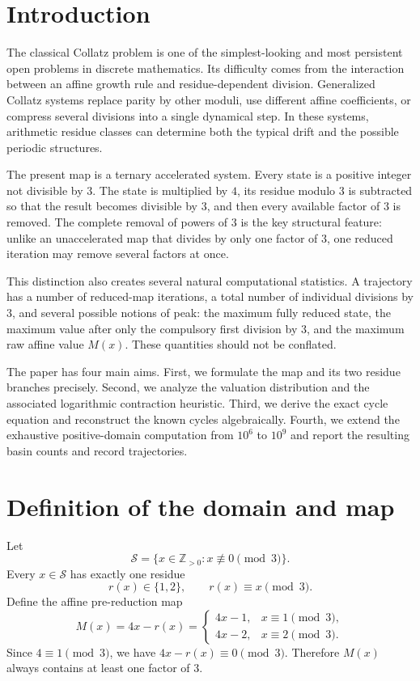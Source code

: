 \documentclass[11pt]{article}
\newcommand{\Sset}{\mathcal S}
\newcommand{\Mmap}{M}
\begin{document}
\section{Introduction}
The classical Collatz problem is one of the simplest-looking and most persistent open problems in discrete mathematics.  Its difficulty comes from the interaction between an affine growth rule and residue-dependent division.  Generalized Collatz systems replace parity by other moduli, use different affine coefficients, or compress several divisions into a single dynamical step.  In these systems, arithmetic residue classes can determine both the typical drift and the possible periodic structures.

The present map is a ternary accelerated system.  Every state is a positive integer not divisible by $3$.  The state is multiplied by $4$, its residue modulo $3$ is subtracted so that the result becomes divisible by $3$, and then every available factor of $3$ is removed.  The complete removal of powers of $3$ is the key structural feature: unlike an unaccelerated map that divides by only one factor of $3$, one reduced iteration may remove several factors at once.

This distinction also creates several natural computational statistics.  A trajectory has a number of reduced-map iterations, a total number of individual divisions by $3$, and several possible notions of peak: the maximum fully reduced state, the maximum value after only the compulsory first division by $3$, and the maximum raw affine value $\Mmap(x)$.  These quantities should not be conflated.

The paper has four main aims.  First, we formulate the map and its two residue branches precisely.  Second, we analyze the valuation distribution and the associated logarithmic contraction heuristic.  Third, we derive the exact cycle equation and reconstruct the known cycles algebraically.  Fourth, we extend the exhaustive positive-domain computation from $10^6$ to $10^9$ and report the resulting basin counts and record trajectories.

\section{Definition of the domain and map}
Let
\begin{equation}
\Sset=\{x\in\mathbb Z_{>0}:x\not\equiv0\pmod3\}.
\end{equation}
Every $x\in\Sset$ has exactly one residue
\[
r(x)\in\{1,2\},\qquad r(x)\equiv x\pmod3.
\]
Define the affine pre-reduction map
\begin{equation}
\Mmap(x)=4x-r(x)=
\begin{cases}
4x-1,&x\equiv1\pmod3,\\
4x-2,&x\equiv2\pmod3.
\end{cases}
\label{eq:M}
\end{equation}
Since $4\equiv1\pmod3$, we have $4x-r(x)\equiv0\pmod3$.  Therefore $\Mmap(x)$ always contains at least one factor of $3$.
\end{document}
